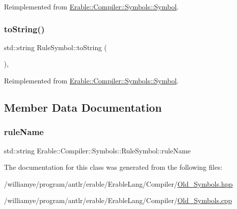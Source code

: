 Reimplemented from \mbox{\hyperlink{class_erable_1_1_compiler_1_1_symbols_1_1_symbol_a108a4a3e9b9a2785f14ed580e813a52a}{Erable\+::\+Compiler\+::\+Symbols\+::\+Symbol}}.

\mbox{\label{class_erable_1_1_compiler_1_1_symbols_1_1_rule_symbol_a068e32fb9ed0059c3da44fe47402a084}} 
\subsubsection{\texorpdfstring{toString()}{toString()}}
{\footnotesize\ttfamily std\+::string Rule\+Symbol\+::to\+String (\begin{DoxyParamCaption}{ }\end{DoxyParamCaption})\hspace{0.3cm}{\ttfamily [override]}, {\ttfamily [virtual]}}



Reimplemented from \mbox{\hyperlink{class_erable_1_1_compiler_1_1_symbols_1_1_symbol_ac133ad05913f81e836ae2f73815d1432}{Erable\+::\+Compiler\+::\+Symbols\+::\+Symbol}}.



\subsection{Member Data Documentation}
\mbox{\label{class_erable_1_1_compiler_1_1_symbols_1_1_rule_symbol_a776f254959afc7fe4f4865f15673d5b8}} 
\subsubsection{\texorpdfstring{ruleName}{ruleName}}
{\footnotesize\ttfamily std\+::string Erable\+::\+Compiler\+::\+Symbols\+::\+Rule\+Symbol\+::rule\+Name}



The documentation for this class was generated from the following files\+:\begin{DoxyCompactItemize}
\item 
/williamye/program/antlr/erable/\+Erable\+Lang/\+Compiler/\mbox{\hyperlink{_old___symbols_8hpp}{Old\+\_\+\+Symbols.\+hpp}}\item 
/williamye/program/antlr/erable/\+Erable\+Lang/\+Compiler/\mbox{\hyperlink{_old___symbols_8cpp}{Old\+\_\+\+Symbols.\+cpp}}\end{DoxyCompactItemize}
